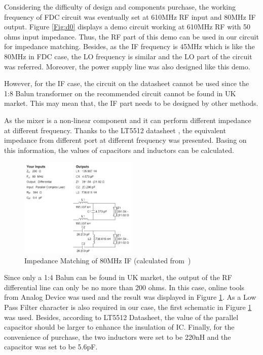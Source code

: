\documentclass[12pt, a4paper]{report}
\begin{document}
Considering the difficulty of design and components purchase, the working frequency of FDC circuit was eventually set at 610MHz RF input and 80MHz IF output. Figure \ref{Fig:d0} displays a demo circuit working at 610MHz RF with 50 ohms input impedance. Thus, the RF part of this demo can be used in our circuit for impedance matching. Besides, as the IF frequency is 45MHz which is like the 80MHz in FDC case, the LO frequency is similar and the LO part of the circuit was referred. Moreover, the power supply line was also designed like this demo.

However, for the IF case, the circuit on the datasheet cannot be used since the 1:8 Balun transformer on the recommended circuit cannot be found in UK market. This may mean that, the IF part needs to be designed by other methods.

As the mixer is a non-linear component and it can perform different impedance at different frequency. Thanks to the LT5512 datasheet \cite{ref:LT5512}, the equivalent impedance from different port at different frequency was presented. Basing on this information, the values of capacitors and inductors can be calculated.

\begin{figure}[htbp]     \begin{centering}
    \includegraphics[width=0.5\textwidth]{img/d0_if.png}
    \caption{\label{Fig:d0_if}Impedance Matching of 80MHz IF (calculated from~\cite{ref:rf_im})}
    \end{centering}
    
\end{figure}

Since only a 1:4 Balun can be found in UK market, the output of the RF differential line can only be no more than 200 ohms. In this case, online tools \cite{ref:rf_im} from Analog Device was used and the result was displayed in Figure \ref{Fig:d0_if}. As a Low Pass Filter character is also required in our case, the first schematic in Figure \ref{Fig:d0_if} was used. Besides, according to LT5512 Datasheet\cite{ref:LT5512}, the value of the parallel capacitor should be larger to enhance the insulation of IC. Finally, for the convenience of purchase, the two inductors were set to be 220nH and the capacitor was set to be 5.6pF.
\end{document}
